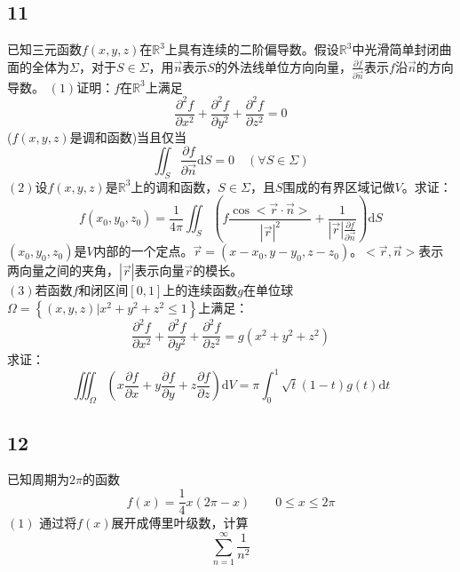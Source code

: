 \documentclass[a4paper,12pt]{article}
\begin{document}
\subsection*{11}\noindent 已知三元函数$f\left(x,y,z\right)$在$\mathbb{R}^3$上具有连续的二阶偏导数。假设$\mathbb{R}^3$中光滑简单封闭曲面的全体为$\Sigma$，对于$S\in \Sigma$，用$\vec{n}$表示$S$的外法线单位方向向量，$\frac{\partial f}{\partial \vec{n}}$表示$f$沿$\vec{n}$的方向导数。
\noindent $\left(1\right)$证明：$f$在$\mathbb{R}^3$上满足\begin{equation*}
	\frac{\partial^2 f}{\partial x^2}+	\frac{\partial^2 f}{\partial y^2}+	\frac{\partial^2 f}{\partial z^2}=0
\end{equation*}
($f(x,y,z)$是调和函数)当且仅当\begin{equation*}
	\iint_{S}\frac{\partial f}{\partial \vec{n}}\mathrm{d}S=0\quad \left(\forall S\in\Sigma\right)
\end{equation*}
\noindent $\left(2\right)$设$f(x,y,z)$是$\mathbb{R}^3$上的调和函数，$S\in \Sigma$，且$S$围成的有界区域记做$V$。求证：
\begin{equation*}
	f\left(x_{0},y_{0},z_{0}\right)=\frac{1}{4\pi}\iint_{S}\left(f\frac{\cos<\vec{r}\cdot\vec{n}>}{|\vec{r}|^2}+\frac{1}{|\vec{r}|\frac{\partial f}{\partial \vec{n}}}\right)\mathrm{d}S
\end{equation*}
$\left(x_{0},y_{0},z_{0}\right)$是$V$内部的一个定点。$\vec{r}=\left(x-x_{0},y-y_{0},z-z_{0}\right)$。$<\vec{r},\vec{n}>$表示两向量之间的夹角，$|\vec{r}|$表示向量$\vec{r}$的模长。\\
\noindent $\left(3\right)$若函数$f$和闭区间$\left[0,1\right]$上的连续函数$g$在单位球$\Omega=\left\{\left(x,y,z\right)|x^2+y^2+z^2\leq 1\right\}$上满足：\begin{equation*}
	\frac{\partial^2 f}{\partial x^2}+	\frac{\partial^2 f}{\partial y^2}+	\frac{\partial^2 f}{\partial z^2}=g\left(x^2+y^2+z^2\right)
\end{equation*}
求证：
\begin{equation*}
	\iiint_{\Omega}\left(x \frac{\partial f}{\partial x}+y	\frac{\partial f}{\partial y}+z	\frac{\partial f}{\partial z}\right)\mathrm{d}V=\pi\int_{0}^{1}\sqrt{t}\left(1-t\right)g\left(t\right)\mathrm{d}t
\end{equation*}

\subsection*{12}\noindent 已知周期为$2\pi$的函数\begin{equation*}
	f(x)=\frac{1}{4}x\left(2\pi -x\right)\qquad 0\leq x\leq 2\pi
\end{equation*}
\noindent $\left(1\right)$ 通过将$f(x)$展开成傅里叶级数，计算
\begin{equation*}
	\sum_{n=1}^{\infty}\frac{1}{n^2}
\end{equation*}
\end{document}
